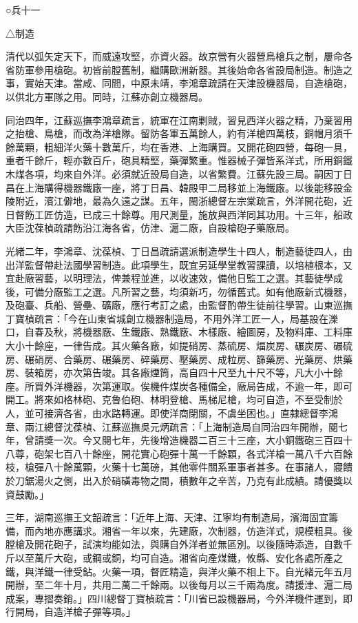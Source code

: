 
\begin{pinyinscope}
○兵十一

△制造

清代以弧矢定天下，而威遠攻堅，亦資火器。故京營有火器營鳥槍兵之制，屢命各省防軍參用槍砲。初皆前膛舊制，繼購歐洲新器。其後始命各省設局制造。制造之事，實始天津。當咸、同間，中原未靖，李鴻章疏請在天津設機器局，自造槍砲，以供北方軍隊之用。同時，江蘇亦創立機器局。

同治四年，江蘇巡撫李鴻章疏言，統軍在江南剿賊，習見西洋火器之精，乃棄習用之抬槍、鳥槍，而改為洋槍隊。留防各軍五萬餘人，約有洋槍四萬枝，銅帽月須千餘萬顆，粗細洋火藥十數萬斤，均在香港、上海購買。又開花砲四營，每砲一具，重者千餘斤，輕亦數百斤，砲具精堅，藥彈繁重。惟器械子彈皆系洋式，所用銅鐵木煤各項，均來自外洋。必須就近設局自造，以省繁費。江蘇先設三局。嗣因丁日昌在上海購得機器鐵廠一座，將丁日昌、韓殿甲二局移並上海鐵廠。以後能移設金陵附近，濱江僻地，最為久遠之謀。五年，閩浙總督左宗棠疏言，外洋開花砲，近日督飭工匠仿造，已成三十餘尊。用尺測量，施放與西洋同其功用。十三年，船政大臣沈葆楨疏請飭沿江海各省，仿津、滬二廠，自設槍砲子藥廠局。

光緒二年，李鴻章、沈葆楨、丁日昌疏請選派制造學生十四人，制造藝徒四人，由出洋監督帶赴法國學習制造。此項學生，既宜另延學堂教習課讀，以培植根本，又宜赴廠習藝，以明理法，俾兼程並進，以收速效，備他日監工之選。其藝徒學成後，可備分廠監工之選。凡所習之藝，均須新巧，勿循舊式。如有他廠新式機器，及砲臺、兵船、營壘、礦廠，應行考訂之處，由監督酌帶生徒前往學習。山東巡撫丁寶楨疏言：「今在山東省城創立機器制造局，不用外洋工匠一人，局基設在濼口，自春及秋，將機器廠、生鐵廠、熟鐵廠、木樣廠、繪圖房，及物料庫、工料庫大小十餘座，一律告成。其火藥各廠，如提硝房、蒸硫房、煏炭房、碾炭房、碾硫房、碾硝房、合藥房、碾藥房、碎藥房、壓藥房、成粒房、篩藥房、光藥房、烘藥房、裝箱房，亦次第告竣。其各廠煙筒，高自四十尺至九十尺不等，凡大小十餘座。所買外洋機器，次第運取。俟機件煤炭各種備全，廠局告成，不逾一年，即可開工。將來如格林砲、克魯伯砲、林明登槍、馬梯尼槍，均可自造，不至受制於人，並可接濟各省，由水路轉運。即使洋商閉關，不虞坐困也。」直隸總督李鴻章、兩江總督沈葆楨、江蘇巡撫吳元炳疏言：「上海制造局自同治四年開辦，閱七年，曾請獎一次。今又閱七年，先後增造機器二百三十三座，大小銅鐵砲三百四十八尊，砲架七百八十餘座，開花實心砲彈十萬一千餘顆，各式洋槍一萬八千六百餘枝，槍彈八十餘萬顆，火藥十七萬磅，其他零件關系軍事者甚多。在事諸人，寢饋於刀鋸湯火之側，出入於硝磺毒物之間，積數年之辛苦，乃克有此成績。請優獎以資鼓勵。」

三年，湖南巡撫王文韶疏言：「近年上海、天津、江寧均有制造局，濱海固宜籌備，而內地亦應講求。湘省一年以來，先建廠，次制器，仿造洋式，規模粗具。後膛槍及開花砲子，試演均能如法，與購自外洋者並無區別。以後隨時添造，自數千斤以至萬斤大砲，或鋼或銅，均可自造。湘省向產煤鐵，攸縣、安化各處所產之鐵，與洋鐵一律受鉆。火藥一項，督匠精造，與洋火藥不相上下。自光緒元年五月開辦，至二年十月，共用二萬二千餘兩。以後每月以三千兩為度。請援津、滬二局成案，專摺奏銷。」四川總督丁寶楨疏言：「川省已設機器局，今外洋機件運到，即行開局，自造洋槍子彈等項。」


\end{pinyinscope}
